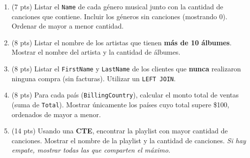 \documentclass[11pt,a4paper]{article}
\begin{document}
\begin{enumerate}

  \item (7 pts) Listar el \texttt{Name} de cada género musical junto con la cantidad de canciones que contiene. Incluir los géneros sin canciones (mostrando 0). Ordenar de mayor a menor cantidad.

  \vspace{4cm}

  \item (8 pts) Listar el nombre de los artistas que tienen \textbf{más de 10 álbumes}. Mostrar el nombre del artista y la cantidad de álbumes.

  \vspace{4cm}

  \item (8 pts) Listar el \texttt{FirstName} y \texttt{LastName} de los clientes que \textbf{nunca} realizaron ninguna compra (sin facturas). Utilizar un \texttt{LEFT JOIN}.

  \vspace{4cm}

  \item (8 pts) Para cada país (\texttt{BillingCountry}), calcular el monto total de ventas (suma de \texttt{Total}). Mostrar únicamente los países cuyo total supere \$100, ordenados de mayor a menor.

  \vspace{4cm}

  \item (14 pts) Usando una \textbf{CTE}, encontrar la playlist con mayor cantidad de canciones. Mostrar el nombre de la playlist y la cantidad de canciones. \emph{Si hay empate, mostrar todas las que comparten el máximo.}

  \vspace{5cm}

\end{enumerate}
\end{document}
